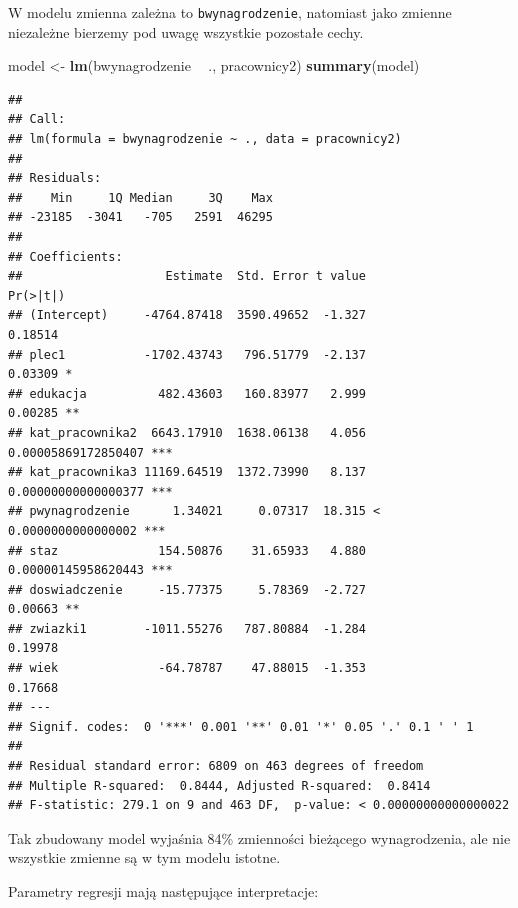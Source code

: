 \documentclass[]{book}
\newenvironment{Shaded}{\begin{snugshade}}{\end{snugshade}}
\newcommand{\KeywordTok}[1]{\textcolor[rgb]{0.13,0.29,0.53}{\textbf{#1}}}
\newcommand{\NormalTok}[1]{#1}
\newcommand{\OperatorTok}[1]{\textcolor[rgb]{0.81,0.36,0.00}{\textbf{#1}}}
\newcommand{\StringTok}[1]{\textcolor[rgb]{0.31,0.60,0.02}{#1}}
\begin{document}
W modelu zmienna zależna to \texttt{bwynagrodzenie}, natomiast jako zmienne niezależne bierzemy pod uwagę wszystkie pozostałe cechy.

\begin{Shaded}
\begin{Highlighting}[]
\NormalTok{model <-}\StringTok{ }\KeywordTok{lm}\NormalTok{(bwynagrodzenie }\OperatorTok{~}\StringTok{ }\NormalTok{., pracownicy2)}
\KeywordTok{summary}\NormalTok{(model)}
\end{Highlighting}
\end{Shaded}

\begin{verbatim}
## 
## Call:
## lm(formula = bwynagrodzenie ~ ., data = pracownicy2)
## 
## Residuals:
##    Min     1Q Median     3Q    Max 
## -23185  -3041   -705   2591  46295 
## 
## Coefficients:
##                    Estimate  Std. Error t value             Pr(>|t|)    
## (Intercept)     -4764.87418  3590.49652  -1.327              0.18514    
## plec1           -1702.43743   796.51779  -2.137              0.03309 *  
## edukacja          482.43603   160.83977   2.999              0.00285 ** 
## kat_pracownika2  6643.17910  1638.06138   4.056  0.00005869172850407 ***
## kat_pracownika3 11169.64519  1372.73990   8.137  0.00000000000000377 ***
## pwynagrodzenie      1.34021     0.07317  18.315 < 0.0000000000000002 ***
## staz              154.50876    31.65933   4.880  0.00000145958620443 ***
## doswiadczenie     -15.77375     5.78369  -2.727              0.00663 ** 
## zwiazki1        -1011.55276   787.80884  -1.284              0.19978    
## wiek              -64.78787    47.88015  -1.353              0.17668    
## ---
## Signif. codes:  0 '***' 0.001 '**' 0.01 '*' 0.05 '.' 0.1 ' ' 1
## 
## Residual standard error: 6809 on 463 degrees of freedom
## Multiple R-squared:  0.8444, Adjusted R-squared:  0.8414 
## F-statistic: 279.1 on 9 and 463 DF,  p-value: < 0.00000000000000022
\end{verbatim}

Tak zbudowany model wyjaśnia 84\% zmienności bieżącego wynagrodzenia, ale nie wszystkie zmienne są w tym modelu istotne.

Parametry regresji mają następujące interpretacje:
\end{document}
